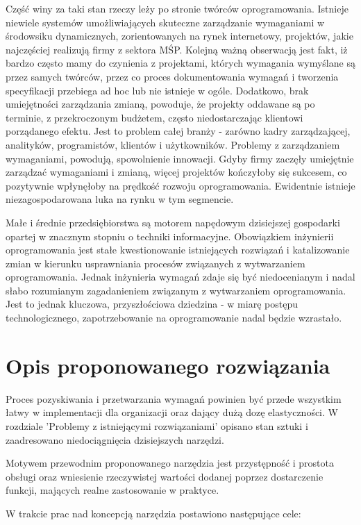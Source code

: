     Część winy za taki stan rzeczy leży po stronie twórców oprogramowania. Istnieje niewiele systemów umożliwiających skuteczne zarządzanie wymaganiami w środowsiku dynamicznych, zorientowanych na rynek internetowy, projektów, jakie najczęściej realizują firmy z sektora MŚP. Kolejną ważną obserwacją jest fakt, iż bardzo często mamy do czynienia z projektami, których wymagania wymyślane są przez samych twórców, przez co proces dokumentowania wymagań i tworzenia specyfikacji przebiega ad hoc lub nie istnieje w ogóle. Dodatkowo, brak umiejętności zarządzania zmianą, powoduje, że projekty oddawane są po terminie, z przekroczonym budżetem, często niedostarczając klientowi porządanego efektu. Jest to problem całej branży - zarówno kadry zarządzającej, analityków, programistów, klientów i użytkowników. Problemy z zarządzaniem wymaganiami, powodują, spowolnienie innowacji. Gdyby firmy zaczęły umiejętnie zarządzać wymaganiami i zmianą, więcej projektów kończyłoby się sukcesem, co pozytywnie wpłynęłoby na prędkość rozwoju oprogramowania. Ewidentnie istnieje niezagospodarowana luka na rynku w tym segmencie. 

    Małe i średnie przedsiębiorstwa są motorem napędowym dzisiejszej gospodarki opartej w znacznym stopniu o techniki informacyjne. Obowiązkiem inżynierii oprogramowania jest stałe kwestionowanie istniejących rozwiązań i katalizowanie zmian w kierunku usprawniania procesów związanych z wytwarzaniem oprogramowania. Jednak inżynieria wymagań zdaje się być niedocenianym i nadal słabo rozumianym zagadanieniem związanym z wytwarzaniem oprogramowania. Jest to jednak kluczowa, przyszłościowa dziedzina - w miarę postępu technologicznego, zapotrzebowanie na oprogramowanie nadal będzie wzrastało.

  \section{Opis proponowanego rozwiązania}

    Proces pozyskiwania i przetwarzania wymagań powinien być przede wszystkim łatwy w implementacji dla organizacji oraz dający dużą dozę elastyczności. W rozdziale 'Problemy z istniejącymi rozwiązaniami' opisano stan sztuki i zaadresowano niedociągnięcia dzisiejszych narzędzi. 

    Motywem przewodnim proponowanego narzędzia jest przystępność i prostota obsługi oraz wniesienie rzeczywistej wartości dodanej poprzez dostarczenie funkcji, mających realne zastosowanie w praktyce. 

    W trakcie prac nad koncepcją narzędzia postawiono następujące cele:
    
